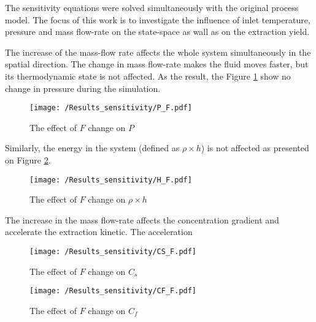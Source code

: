 \documentclass[../Article_Model_Parameters.tex]{subfiles}
\begin{document}
	
	\label{CH: Results}
	
	The sensitivity equations were solved simultaneously with the original process model. The focus of this work is to investigate the influence of inlet temperature, pressure and mass flow-rate on the state-space as wall as on the extraction yield. 
	
	The increase of the mass-flow rate affects the whole system simultaneously in the spatial direction. The change in mass flow-rate makes the fluid moves faster, but its thermodynamic state is not affected. As the result, the  Figure \ref{fig:Sensitivty_F_P} show no change in pressure during the simulation. 
    
    \begin{figure}[h!]
    	\centering
    	\texttt{[image: /Results\_sensitivity/P\_F.pdf]}
    	\caption{The effect of $F$ change on $P$}
    	\label{fig:Sensitivty_F_P}
    \end{figure}
    
    Similarly, the energy in the system (defined as $\rho \times h$) is not affected as presented on Figure \ref{fig:Sensitivty_F_H}.
    
    \begin{figure}[h!]
    	\centering
    	\texttt{[image: /Results\_sensitivity/H\_F.pdf]}
    	\caption{The effect of $F$ change on $\rho \times h$}
    	\label{fig:Sensitivty_F_H}
    \end{figure}
    
    The increase in the mass flow-rate affects the concentration gradient and accelerate the extraction kinetic. The acceleration 
    
    \begin{figure}[h!]
    	\centering
    	\texttt{[image: /Results\_sensitivity/CS\_F.pdf]}
    	\caption{The effect of $F$ change on $C_s$}
    	\label{fig:Sensitivty_F_CS}
    \end{figure}
    
    \begin{figure}[h!]
    	\centering
    	\texttt{[image: /Results\_sensitivity/CF\_F.pdf]}
    	\caption{The effect of $F$ change on $C_f$}
    	\label{fig:Sensitivty_F_CF}
    \end{figure}
    
	
\end{document}
